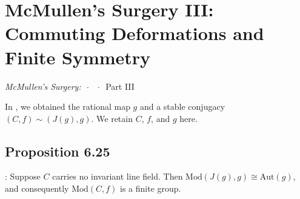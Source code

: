 \documentclass[11pt,a4paper]{article}
\begin{document}
\section*{McMullen's Surgery III: Commuting Deformations and Finite Symmetry}
\begin{center}
\emph{McMullen's Surgery:}
 \(\,\cdot\,\)
 \(\,\cdot\,\) Part III
\end{center}

In , we obtained the rational map $g$ and a stable conjugacy $(C,f)\sim(J(g),g)$. We retain $C$, $f$, and $g$ here.

\subsection*{Proposition 6.25}: Suppose $C$ carries no invariant line field. Then $\text{Mod}(J(g), g) \cong \text{Aut}(g)$, and consequently $\text{Mod}(C, f)$ is a finite group.

\end{document}

